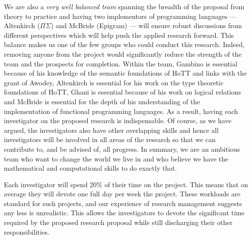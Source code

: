 \documentclass[a4paper,11pt]{article}
\begin{document}
\noindent 
We are also a {\em very well balanced team} spanning the breadth of
the proposal from theory to practice and having two implementors of
programming languages --- Altenkirch ($\Pi\Sigma$) and McBride
(Epigram) --- will ensure robust discussions from different
perspectives which will help push the applied research forward.  This
balance makes us one of the few groups who could conduct this
research. Indeed, removing anyone from the project would
significantly reduce the strength of the team and the prospects for
completion. Within the team, Gambino is essential because of his
knowledge of the semantic foundations of HoTT and links with the grant
of Awodey, Altenkirch is essential for his work on the type theoretic
foundations of HoTT, Ghani is essential because of his work on logical
relations and McBride is essential for the depth of his understanding
of the implementation of functional programming languages.  As a
result, having each investigator on the proposed research is
indispensable. Of course, as we have argued, the investigators also
have other overlapping skills and hence all investigators will be
involved in all areas of the research so that we can contribute to,
and be advised of, all progress. In summary, we are an ambitious team
who want to change the world we live in and who believe we have the
mathematical and computational skills to do exactly that.



\vspace{0.02in}

Each investigator will spend 20\% of their time on the project.
This means that on average they will devote one
full day per week the project. These workloads are standard for such projects, and
our experience of research management suggests any less is 
unrealistic. This allows the investigators to devote the significant
time required by the proposed research proposal while still discharging
their other responsibilities.

\vspace{0.02in}
\end{document}
